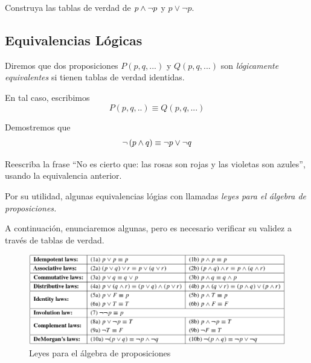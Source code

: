  \begin{problema}
  Construya las tablas de verdad de $p \wedge \neg p$ y $p \vee \neg p.$
 \end{problema}



\subsection{Equivalencias L\'ogicas}


 Diremos que dos proposiciones $P(p,q,...)$ y $Q(p,q,...)$ son \emph{l\'ogicamente equivalentes} si tienen tablas de verdad identidas. 
 
 
 En tal caso, escribimos $$P(p,q,..)\equiv Q(p,q,...)$$



 \begin{problema} Demostremos que 
  $$
  \neg\left( p \wedge q \right) \equiv \neg p \vee \neg q
  $$
 \end{problema}




 \begin{problema}
  Reescriba la frase ``No es cierto que: las rosas son rojas y las violetas son azules'', usando la equivalencia anterior.
 \end{problema}





 Por su utilidad, algunas equivalencias l\'ogias con llamadas \emph{leyes para el \'algebra de proposiciones.}
 
 
 A continuaci\'on, enunciaremos algunas, pero es necesario verificar su validez a trav\'es de tablas de verdad. 



\begin{figure}
	\centering
	\includegraphics[width=\linewidth]{md/tabla_4-1}
 \caption{Leyes para el álgebra de proposiciones}
\label{fig:tabla:4.1}
\end{figure}



